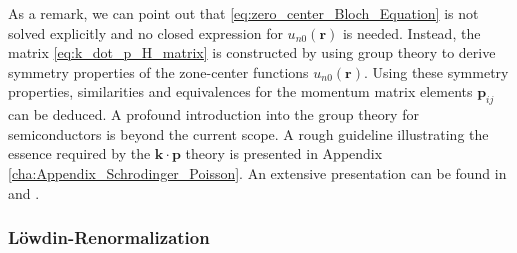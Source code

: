 As a remark, we can point out that \ref{eq:zero_center_Bloch_Equation}
is not solved explicitly and no closed expression for $u_{n0}(\mathbf{r})$
is needed. Instead, the matrix \ref{eq:k_dot_p_H_matrix} is constructed
by using group theory to derive symmetry properties of the zone-center
functions $u_{n0}(\mathbf{r})$. Using these symmetry properties,
similarities and equivalences for the momentum matrix elements $\mathbf{p}_{ij}$
can be deduced. A profound introduction into the group theory for
semiconductors is beyond the current scope. A rough guideline illustrating
the essence required by the $\mathbf{k}\cdot\mathbf{p}$ theory is
presented in Appendix \ref{cha:Appendix_Schrodinger_Poisson}. An
extensive presentation can be found in \citet{Yu2005} and \citet{Bir1974a}.


\subsubsection{L\"{o}wdin-Renormalization}

